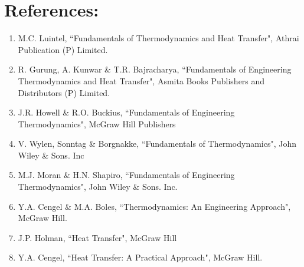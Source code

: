 \section*{References:}
\begin{enumerate}
    \item M.C. Luintel, ``Fundamentals of Thermodynamics and Heat Transfer", Athrai Publication (P) Limited.
    \item R. Gurung, A. Kunwar \& T.R. Bajracharya, ``Fundamentals of Engineering Thermodynamics and Heat Transfer", Asmita Books Publishers and Distributors (P) Limited.
    \item J.R. Howell \& R.O. Buckius, ``Fundamentals of Engineering Thermodynamics", McGraw Hill Publishers
    \item V. Wylen, Sonntag \& Borgnakke, ``Fundamentals of Thermodynamics", John Wiley \& Sons. Inc
    \item M.J. Moran \& H.N. Shapiro, ``Fundamentals of Engineering Thermodynamics", John Wiley \& Sons. Inc.
    \item Y.A. Cengel \& M.A. Boles, ``Thermodynamics: An Engineering Approach", McGraw Hill.
    \item J.P. Holman, ``Heat Transfer", McGraw Hill
    \item Y.A. Cengel, ``Heat Transfer: A Practical Approach", McGraw Hill.
\end{enumerate}